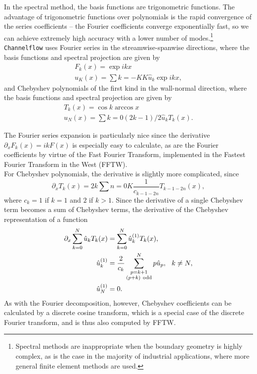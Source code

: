 In the spectral method, the basis functions are trigonometric functions. The advantage of trigonometric functions over polynomials is the rapid convergence of the series coefficients -- the Fourier coefficients converge exponentially fast, so we can achieve extremely high accuracy with a lower number of modes.\footnote{Spectral methods are inappropriate when the boundary geometry is highly complex, as is the case in the majority of industrial applications, where more general finite element methods are used.} {\tt Channelflow} uses Fourier series in the streamwise-spanwise directions, where the basis functions and spectral projection are given by 
\begin{align}
F_k(x) = \exp{ikx}\\
u_K(x) = \sum{k=-K}{K}\hat{u}_k\exp{ikx},
\end{align}
and Chebyshev polynomials of the first kind in the wall-normal direction, where the basis functions and spectral projection are given by
\begin{align}
T_k(x) = \cos{k\arccos{x}}\\
u_N(x) = \sum{k=0}{(2k-1)/2}\hat{u}_kT_k(x).
\end{align}
\par The Fourier series expansion is particularly nice since the derivative $\partial_x F_k(x) = ikF(x)$ is especially easy to calculate, as are the Fourier coefficients by virtue of the Fast Fourier Transform, implemented in the Fastest Fourier Transform in the West (FFTW).\\

For Chebyshev polynomials, the derivative is slightly more complicated, since 
\begin{equation}
\partial_x T_k(x) = 2k\sum{n=0}{K}{\frac{1}{c_{k-1-2n}} T_{k-1-2n}(x)},
\end{equation}
where $c_k = 1$ if $k=1$ and $2$ if $k > 1$. Since the derivative of a single Chebyshev term becomes a sum of Chebyshev terms, the derivative of the Chebyshev representation of a function 
\begin{align}
\partial_x \sum{k=0}{N}\hat{u}_kT_k(x) &= \sum{k=0}{N}\hat{u}_k^{(1)}T_k(x),\\
\hat{u}_k^{(1)} &= \frac{2}{c_k}\sum{\substack{p = k+1\\(p+k) \mathrm{~odd}}}{N} p \hat{u}_p, \hspace{0.25cm} k \neq N,\\
\hat{u}^{(1)}_N &= 0.
\end{align}
As with the Fourier decomposition, however, Chebyshev coefficients can be calculated by a discrete cosine transform, which is a special case of the discrete Fourier transform, and is thus also computed by FFTW. 

